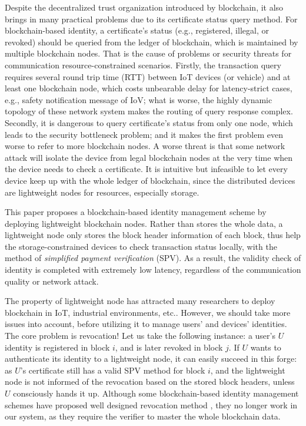 \documentclass[conference]{IEEEtran}
\begin{document}
Despite the decentralized trust organization introduced by blockchain, it also brings in many practical problems due to its certificate status query method. For blockchain-based identity, a certificate's status (e.g., registered, illegal, or revoked) should be queried from the ledger of blockchain, which is maintained by multiple blockchain nodes. That is the cause of problems or security threats for communication resource-constrained scenarios. Firstly, the transaction query requires several round trip time (RTT) between IoT devices (or vehicle) and at least one blockchain node, which costs unbearable delay for latency-strict cases, e.g., safety notification message of IoV; what is worse, the highly dynamic topology of these network system makes the routing of query response complex. Secondly, it is dangerous to  query certificate's status from only one node, which leads to the security bottleneck problem; and it makes the first problem even worse to refer to more blockchain nodes. A worse threat is that some network attack will isolate the device from legal blockchain nodes at the very time when the device needs to check a certificate. 
It is intuitive but infeasible to let every device keep up with the whole ledger of blockchain, since the distributed devices are lightweight nodes for resources, especially storage. 

This paper proposes a blockchain-based identity management scheme by deploying lightweight blockchain nodes. Rather than stores the whole data, a lightweight node only stores the block header information of each block, thus help the storage-constrained devices to check transaction status locally, with the method of \textit{simplified payment verification} (SPV). As a result, the validity check of identity is completed with extremely low latency, regardless of the communication quality or network attack. 

The property of lightweight node has attracted many researchers to deploy blockchain in IoT, industrial environments, etc.. However, we should take more issues into account, before utilizing it to manage users' and devices' identities. The core problem is revocation! Let us take the following instance: a user's $U$ identity is registered in block $i$, and is later revoked in block $j$. If $U$ wants to authenticate its identity to a lightweight node, it can easily succeed in this forge: as $U$'s certificate still has a valid SPV method for block $i$, and the lightweight node is not informed of the revocation based on the stored block headers, unless $U$ consciously hands it up. Although some blockchain-based identity management schemes have proposed well designed revocation method \cite{luoScalaCertScalabilityOrientedPKI2022a, xchameleon, accumulator, bloom}, they no longer work in our system, as they require the verifier to master the whole blockchain data. 
\end{document}
